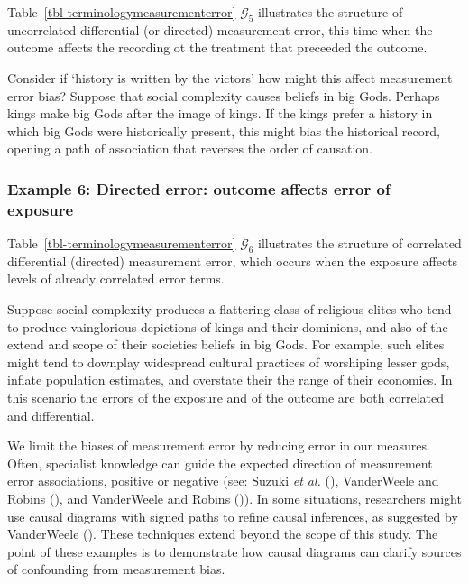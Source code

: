 \documentclass[
  single column]{article}
\begin{document}
Table~\ref{tbl-terminologymeasurementerror} \(\mathcal{G}_5\)
illustrates the structure of uncorrelated differential (or directed)
measurement error, this time when the outcome affects the recording ot
the treatment that preceeded the outcome.

Consider if `history is written by the victors' how might this affect
measurement error bias? Suppose that social complexity causes beliefs in
big Gods. Perhaps kings make big Gods after the image of kings. If the
kings prefer a history in which big Gods were historically present, this
might bias the historical record, opening a path of association that
reverses the order of causation.

\subsubsection{Example 6: Directed error: outcome affects error of
exposure}\label{example-6-directed-error-outcome-affects-error-of-exposure}

Table~\ref{tbl-terminologymeasurementerror} \(\mathcal{G}_6\)
illustrates the structure of correlated differential (directed)
measurement error, which occurs when the exposure affects levels of
already correlated error terms.

Suppose social complexity produces a flattering class of religious
elites who tend to produce vainglorious depictions of kings and their
dominions, and also of the extend and scope of their societies beliefs
in big Gods. For example, such elites might tend to downplay widespread
cultural practices of worshiping lesser gods, inflate population
estimates, and overstate their the range of their economies. In this
scenario the errors of the exposure and of the outcome are both
correlated and differential.

We limit the biases of measurement error by reducing error in our
measures. Often, specialist knowledge can guide the expected direction
of measurement error associations, positive or negative (see: Suzuki
\emph{et al.} (), VanderWeele and Robins
(), and VanderWeele and Robins
()). In some situations,
researchers might use causal diagrams with signed paths to refine causal
inferences, as suggested by VanderWeele
(). These techniques extend beyond
the scope of this study. The point of these examples is to demonstrate
how causal diagrams can clarify sources of confounding from measurement
bias.
\end{document}
